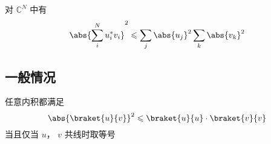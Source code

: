 
对 $\mathbb C^N$ 中有
\begin{equation}
\abs{\sum_i^N u_i^* v_i}^2 \leqslant \sum_j \abs{u_j}^2 \sum_k \abs{v_k}^2
\end{equation}

\subsection{一般情况}
任意内积都满足
\begin{equation}
\abs{\braket{u}{v}}^2 \leqslant \braket{u}{u} \cdot \braket{v}{v}
\end{equation}
当且仅当 $u$， $v$ 共线时取等号